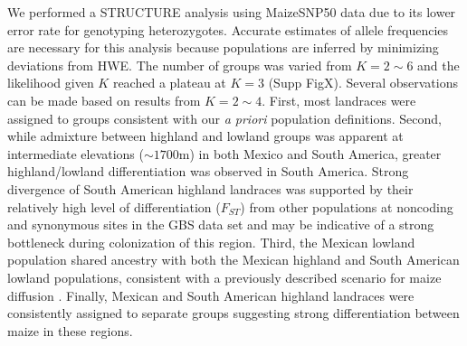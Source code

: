 We performed a {\sf STRUCTURE} analysis  \cite[]{Pritchard_2000_10835412,Falush_2003_12930761} 
using MaizeSNP50 data due to its lower error rate for genotyping heterozygotes. 
Accurate estimates of allele frequencies are necessary for this analysis because populations are inferred by minimizing deviations from HWE.
The number of groups was varied from $K=2\sim6$ and the likelihood given $K$ reached a plateau at $K=3$ (Supp FigX).
Several observations can be made based on results from $K=2\sim4$. 
First, most landraces were assigned to groups consistent with our \emph{a priori} population definitions.
Second, while admixture between highland and lowland groups was apparent at intermediate elevations ($\sim1700$m) in both Mexico and South America, greater highland/lowland differentiation was observed in South America.  
Strong divergence of South American highland landraces was supported by their relatively high level of differentiation ($F_{ST}$) from other populations at noncoding and synonymous sites in the GBS data set and may be indicative of a strong bottleneck during colonization of this region.
Third, the Mexican lowland population shared ancestry with both the Mexican highland and South American lowland populations, consistent with a previously described scenario for maize diffusion \cite[]{Piperno_2006_69}.  
Finally, Mexican and South American highland landraces were consistently assigned to separate groups suggesting strong differentiation between maize in these regions.


 
